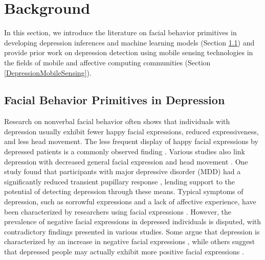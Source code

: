 \section{Background}
In this section, we introduce the literature on facial behavior primitives in developing depression inferences and machine learning models (Section \ref{FacialBehaviorPrimitives}) and provide prior work on depression detection using mobile sensing technologies in the fields of mobile and affective computing communities (Section \ref{DepressionMobileSensing}).

\subsection{Facial Behavior Primitives in Depression } \label{FacialBehaviorPrimitives}
Research on nonverbal facial behavior often shows that individuals with depression usually exhibit fewer happy facial expressions, reduced expressiveness, and less head movement. The less frequent display of happy facial expressions by depressed patients is a commonly observed finding \cite{chentsova2010further, gehricke2000reduced, renneberg2005facial, sloan2001diminished}. Various studies also link depression with decreased general facial expression \cite{renneberg2005facial, gaebel2004facial} and head movement \cite{fisch1983analyzing, joshi2013can, alghowinem_head_2013}. One study found that participants with major depressive disorder (MDD) had a significantly reduced transient pupillary response \cite{laurenzo2016pupillary}, lending support to the potential of detecting depression through these means. Typical symptoms of depression, such as sorrowful expressions and a lack of affective experience, have been characterized by researchers using facial expressions \cite{ellgring2007non}. However, the prevalence of negative facial expressions in depressed individuals is disputed, with contradictory findings presented in various studies. Some argue that depression is characterized by an increase in negative facial expressions \cite{sloan1997subjective, reed2007impact}, while others suggest that depressed people may actually exhibit more positive facial expressions \cite{renneberg2005facial, gaebel2004facial}.

